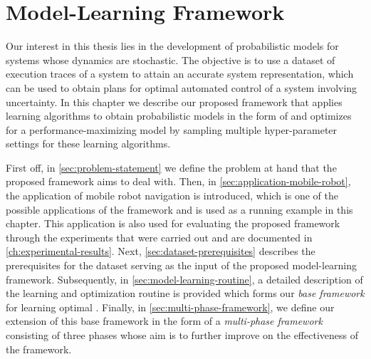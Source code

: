 \chapter{Model-Learning Framework}
\label{ch:methodology}

Our interest in this thesis lies in the development of probabilistic models for systems whose dynamics are stochastic.
The objective is to use a dataset of execution traces of a system to attain an accurate system representation, which can be used to obtain plans for optimal automated control of a system involving uncertainty.
In this chapter we describe our proposed framework that applies learning algorithms to obtain probabilistic models in the form of  and optimizes for a performance-maximizing model by sampling multiple hyper-parameter settings for these learning algorithms.

First off, in \autoref{sec:problem-statement} we define the problem at hand that the proposed framework aims to deal with.
Then, in \autoref{sec:application-mobile-robot}, the application of mobile robot navigation is introduced, which is one of the possible applications of the framework and is used as a running example in this chapter.
This application is also used for evaluating the proposed framework through the experiments that were carried out and are documented in \autoref{ch:experimental-results}.
Next, \autoref{sec:dataset-prerequisites} describes the prerequisites for the dataset serving as the input of the proposed model-learning framework.
Subsequently, in \autoref{sec:model-learning-routine}, a detailed description of the learning and optimization routine is provided which forms our \textit{base framework} for learning optimal .
Finally, in \autoref{sec:multi-phase-framework}, we define our extension of this base framework in the form of a \textit{multi-phase framework} consisting of three phases whose aim is to further improve on the effectiveness of the framework.

